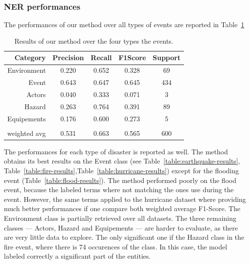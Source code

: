 \subsubsection{NER performances}
The performances of our method over all types of events are reported in Table~\ref{table:overall-results}

\begin{table}[bp]
    \centering
    \caption{Results of our method over the four types the events.}
    \begin{tabular}{rcccc}
        Category     & Precision & Recall & F1\-Score & Support \\
        \toprule
        Environment  & 0.220     & 0.652  & 0.328     & 69      \\
        Event        & 0.643     & 0.647  & 0.645     & 434     \\
        Actors       & 0.040     & 0.333  & 0.071     & 3       \\
        Hazard       & 0.263     & 0.764  & 0.391     & 89      \\
        Equipements  & 0.176     & 0.600  & 0.273     & 5       \\
                     &           &        &           &         \\
        weighted avg & 0.531     & 0.663  & 0.565     & 600     \\
        \bottomrule
    \end{tabular}
    \label{table:overall-results}
\end{table}

The performances for each type of disaster is reported as well.
The method obtains its best results on the Event class (see Table~\ref{table:earthquake-results}, Table~\ref{table:fire-results},Table~\ref{table:hurricane-results})
except for the flooding event (Table~\ref{table:flood-results}).
The method performed poorly on the flood event, because the labeled terms where not matching
the ones use during the event.
However, the same terms applied to the hurricane dataset where providing much better performances
if one compare both weighted average F1-Score.
The Environment class is partially retrieved over all datasets.
The three remaining classes — Actors, Hazard and Equipements — are harder to evaluate,
as there are very little data to explore.
The only significant one if the Hazard class in the fire event, where there is 74 occurences
of the class.
In this case, the model labeled correctly a significant part of the entities.

